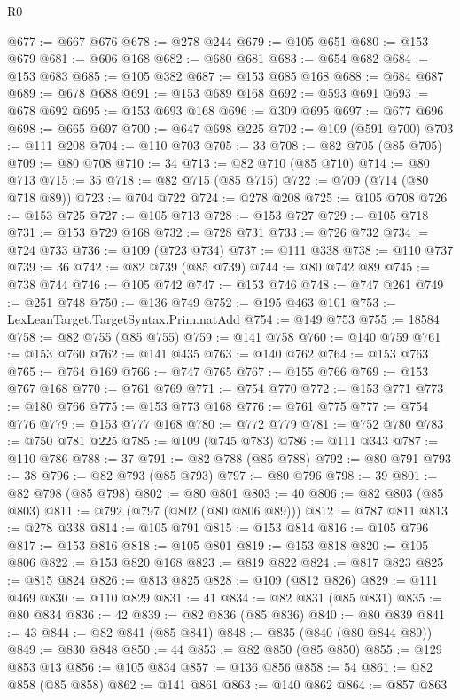 \begin{lexlean}{R0}
\begin{coremodule}
@677 := @667 @676
@678 := @278 @244
@679 := @105 @651
@680 := @153 @679
@681 := @606 @168
@682 := @680 @681
@683 := @654 @682
@684 := @153 @683
@685 := @105 @382
@687 := @153 @685 @168
@688 := @684 @687
@689 := @678 @688
@691 := @153 @689 @168
@692 := @593 @691
@693 := @678 @692
@695 := @153 @693 @168
@696 := @309 @695
@697 := @677 @696
@698 := @665 @697
@700 := @647 @698 @225
@702 := @109 (@591 @700)
@703 := @111 @208
@704 := @110 @703
@705 := 33
@708 := @82 @705 (@85 @705)
@709 := @80 @708
@710 := 34
@713 := @82 @710 (@85 @710)
@714 := @80 @713
@715 := 35
@718 := @82 @715 (@85 @715)
@722 := @709 (@714 (@80 @718 @89))
@723 := @704 @722
@724 := @278 @208
@725 := @105 @708
@726 := @153 @725
@727 := @105 @713
@728 := @153 @727
@729 := @105 @718
@731 := @153 @729 @168
@732 := @728 @731
@733 := @726 @732
@734 := @724 @733
@736 := @109 (@723 @734)
@737 := @111 @338
@738 := @110 @737
@739 := 36
@742 := @82 @739 (@85 @739)
@744 := @80 @742 @89
@745 := @738 @744
@746 := @105 @742
@747 := @153 @746
@748 := @747 @261
@749 := @251 @748
@750 := @136 @749
@752 := @195 @463 @101
@753 := LexLeanTarget.TargetSyntax.Prim.natAdd
@754 := @149 @753
@755 := 18584
@758 := @82 @755 (@85 @755)
@759 := @141 @758
@760 := @140 @759
@761 := @153 @760
@762 := @141 @435
@763 := @140 @762
@764 := @153 @763
@765 := @764 @169
@766 := @747 @765
@767 := @155 @766
@769 := @153 @767 @168
@770 := @761 @769
@771 := @754 @770
@772 := @153 @771
@773 := @180 @766
@775 := @153 @773 @168
@776 := @761 @775
@777 := @754 @776
@779 := @153 @777 @168
@780 := @772 @779
@781 := @752 @780
@783 := @750 @781 @225
@785 := @109 (@745 @783)
@786 := @111 @343
@787 := @110 @786
@788 := 37
@791 := @82 @788 (@85 @788)
@792 := @80 @791
@793 := 38
@796 := @82 @793 (@85 @793)
@797 := @80 @796
@798 := 39
@801 := @82 @798 (@85 @798)
@802 := @80 @801
@803 := 40
@806 := @82 @803 (@85 @803)
@811 := @792 (@797 (@802 (@80 @806 @89)))
@812 := @787 @811
@813 := @278 @338
@814 := @105 @791
@815 := @153 @814
@816 := @105 @796
@817 := @153 @816
@818 := @105 @801
@819 := @153 @818
@820 := @105 @806
@822 := @153 @820 @168
@823 := @819 @822
@824 := @817 @823
@825 := @815 @824
@826 := @813 @825
@828 := @109 (@812 @826)
@829 := @111 @469
@830 := @110 @829
@831 := 41
@834 := @82 @831 (@85 @831)
@835 := @80 @834
@836 := 42
@839 := @82 @836 (@85 @836)
@840 := @80 @839
@841 := 43
@844 := @82 @841 (@85 @841)
@848 := @835 (@840 (@80 @844 @89))
@849 := @830 @848
@850 := 44
@853 := @82 @850 (@85 @850)
@855 := @129 @853 @13
@856 := @105 @834
@857 := @136 @856
@858 := 54
@861 := @82 @858 (@85 @858)
@862 := @141 @861
@863 := @140 @862
@864 := @857 @863

\end{coremodule}
\end{lexlean}
